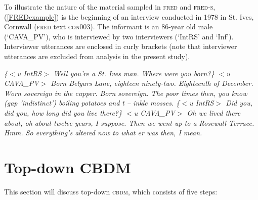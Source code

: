 \documentclass[output=paper]{LSP/langsci}
\begin{document}
To illustrate the nature of the material sampled in \textsc{fred} and \textsc{fred-s}, (\ref{FREDexample}) is the beginning of an interview conducted in 1978 in St. Ives, Cornwall (\textsc{fred} text \textsc{con}003). The informant is an 86-year old male (`CAVA\_PV'), who is interviewed by two interviewers (`IntRS' and `Inf'). Interviewer utterances are enclosed in curly brackets (note that interviewer utterances are excluded from analysis in the present study).
\begin{exe}
\ex \label{FREDexample} \textit{\{$<$u IntRS$>$ Well you're a St. Ives man. Where were you born?\}
\newline$<$u CAVA\_PV$>$ Born Belyars Lane, eighteen ninety-two. Eighteenth of December. Worn sovereign in the cupper. Born sovereign. The poor times then, you know (gap 'indistinct') boiling potatoes and t -- inkle mosses.
\newline\{$<$u IntRS$>$ Did you, did you, how long did you live there?\}
\newline$<$u CAVA\_PV$>$ Oh we lived there about, oh about twelve years, I suppose. Then we went up to a Rosewall Terrace. Hmm. So everything's altered now to what er was then, I mean.}
\end{exe}

\section{Top-down CBDM} \label{topdown}

This section will discuss top-down \textsc{cbdm}, which consists of five steps:
\end{document}
